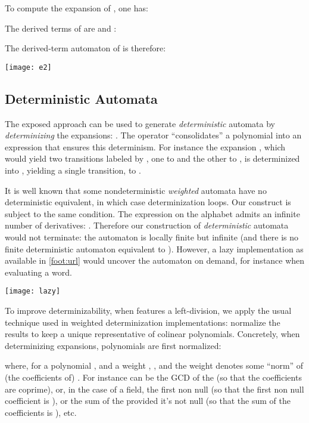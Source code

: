 \documentclass[a4paper,USenglish]{lipics}
\begin{document}
\begin{longenv}
  \begin{Example}
    To compute the expansion of , one has:
    \newcommand{\dterm}[1]{\fcolorbox{black}{lip}{}}
    

    \label{ex:e2:aut}
    The derived terms of  are  and :
    

    The derived-term automaton of  is therefore:

    \centerline{\texttt{[image: e2]}}
  \end{Example}
  \vspace{-10mm}
\end{longenv}

\subsection{Deterministic Automata}
\label{sec:determ}
The exposed approach can be used to generate \emph{deterministic} automata
by \emph{determinizing} the expansions:
.
The  operator ``consolidates'' a polynomial into an
expression that ensures this determinism.  For instance the expansion
, which would yield two
transitions labeled by , one to  and the other to , is determinized
into , yielding a single transition, to .

It is well known that some nondeterministic \emph{weighted} automata have no
deterministic equivalent, in which case determinization loops.  Our
construct is subject to the same condition.  The expression
 on the alphabet  admits an
infinite number of derivatives:
.  Therefore
our construction of \emph{deterministic} automata would not terminate: the
automaton is locally finite but infinite (and there is no finite
deterministic automaton equivalent to ).  However, a lazy
implementation as available in \vcsn{}\cref{foot:url} would uncover the
automaton on demand, for instance when evaluating a word.

\smallskip
\centerline{\texttt{[image: lazy]}}

To improve determinizability, when  features a left-division, we apply
the usual technique used in weighted determinization implementations:
normalize the results to keep a unique representative of colinear
polynomials.  Concretely, when determinizing expansions, polynomials are
first normalized:

where, for a polynomial , and a
weight ,
,
and the weight  denotes some ``norm'' of (the coefficients of)
.  For instance  can be the GCD of the  (so that the
coefficients are coprime), or, in the case of a field, the first non null
 (so that the first non null coefficient is ), or the sum of the
 provided it's not null (so that the sum of the coefficients is
), etc.
\end{document}
